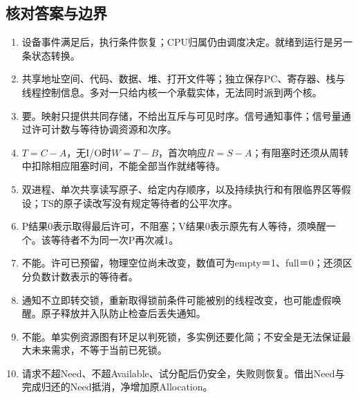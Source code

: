\subsection{核对答案与边界}\label{OS02-recall-answers}

\begin{enumerate}
\def\labelenumi{\arabic{enumi}.}
\tightlist
\item
  设备事件满足后，执行条件恢复；CPU归属仍由调度决定。就绪到运行是另一条状态转换。
\item
  共享地址空间、代码、数据、堆、打开文件等；独立保存PC、寄存器、栈与线程控制信息。多对一只给内核一个承载实体，无法同时派到两个核。
\item
  要。映射只提供共同存储，不给出互斥与可见时序。信号通知事件；信号量通过许可计数与等待协调资源和次序。
\item
  \(T=C-A\)，无I/O时\(W=T-B\)，首次响应\(R=S-A\)；有阻塞时还须从周转中扣除相应阻塞时间，不能全部当作就绪等待。
\item
  双进程、单次共享读写原子、给定内存顺序，以及持续执行和有限临界区等假设；TS的原子读改写没有规定等待者的公平次序。
\item
  P结果0表示取得最后许可，不阻塞；V结果0表示原先有人等待，须唤醒一个。该等待者不为同一次P再次减1。
\item
  不能。许可已预留，物理空位尚未改变，数值可为empty＝1、full＝0；还须区分负数计数表示的等待者。
\item
  通知不立即转交锁，重新取得锁前条件可能被别的线程改变，也可能虚假唤醒。原子释放并入队防止检查后丢失通知。
\item
  不能。单实例资源图有环足以判死锁，多实例还要化简；不安全是无法保证最大未来需求，不等于当前已死锁。
\item
  请求不超Need、不超Available、试分配后仍安全，失败则恢复。借出Need与完成归还的Need抵消，净增加原Allocation。
\end{enumerate}
